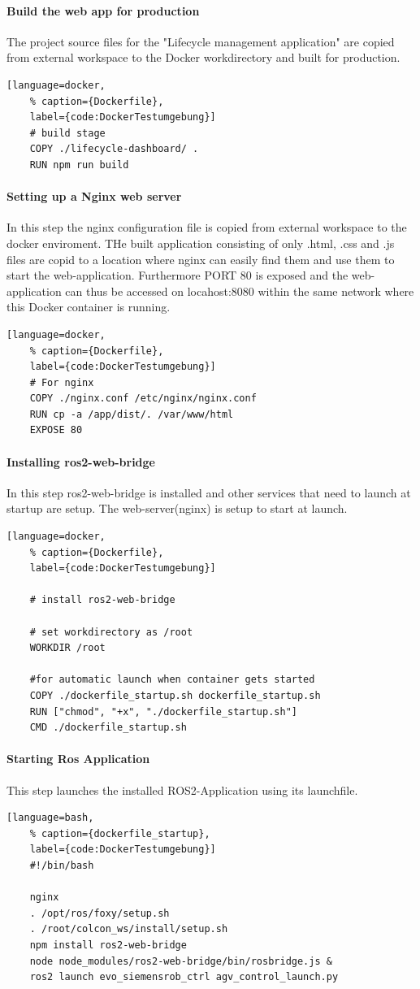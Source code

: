 \paragraph*{Build the web app for production} The project source files for the "Lifecycle management application" are copied from external workspace to the Docker workdirectory and built for production.
\begin{lstlisting}[language=docker,
	% caption={Dockerfile}, 
	label={code:DockerTestumgebung}]
	# build stage
	COPY ./lifecycle-dashboard/ .
	RUN npm run build
\end{lstlisting}

\paragraph{Setting up a Nginx web server} In this step the nginx configuration file is copied from external workspace to the docker enviroment. THe built application consisting of only .html, .css and .js files are copid to a location where nginx can easily find them and use them to start the web-application. Furthermore PORT 80 is exposed and the web-application can thus be accessed on locahost:8080 within the same network where this Docker container is running.
\begin{lstlisting}[language=docker,
	% caption={Dockerfile}, 
	label={code:DockerTestumgebung}]
	# For nginx
	COPY ./nginx.conf /etc/nginx/nginx.conf
	RUN cp -a /app/dist/. /var/www/html
	EXPOSE 80
\end{lstlisting}

\paragraph*{Installing ros2-web-bridge} In this step ros2-web-bridge is installed and other services that need to launch at startup are setup. The web-server(nginx) is setup to start at launch.
\begin{lstlisting}[language=docker,
	% caption={Dockerfile}, 
	label={code:DockerTestumgebung}]
	
	# install ros2-web-bridge

	# set workdirectory as /root
	WORKDIR /root

	#for automatic launch when container gets started 
	COPY ./dockerfile_startup.sh dockerfile_startup.sh
	RUN ["chmod", "+x", "./dockerfile_startup.sh"]
	CMD ./dockerfile_startup.sh	
\end{lstlisting}

\paragraph{Starting Ros Application} This step launches the installed ROS2-Application using its launchfile.
\begin{lstlisting}[language=bash,
	% caption={dockerfile_startup}, 
	label={code:DockerTestumgebung}]
	#!/bin/bash

	nginx
	. /opt/ros/foxy/setup.sh
	. /root/colcon_ws/install/setup.sh
	npm install ros2-web-bridge
	node node_modules/ros2-web-bridge/bin/rosbridge.js &
	ros2 launch evo_siemensrob_ctrl agv_control_launch.py 
\end{lstlisting}

